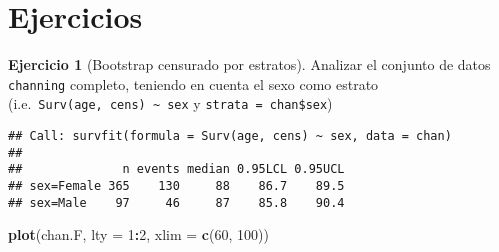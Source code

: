 \documentclass[
]{book}
\newenvironment{Shaded}{\begin{snugshade}}{\end{snugshade}}
\newcommand{\CommentTok}[1]{\textcolor[rgb]{0.56,0.35,0.01}{\textit{#1}}}
\newcommand{\DataTypeTok}[1]{\textcolor[rgb]{0.13,0.29,0.53}{#1}}
\newcommand{\DecValTok}[1]{\textcolor[rgb]{0.00,0.00,0.81}{#1}}
\newcommand{\KeywordTok}[1]{\textcolor[rgb]{0.13,0.29,0.53}{\textbf{#1}}}
\newcommand{\NormalTok}[1]{#1}
\newcommand{\OperatorTok}[1]{\textcolor[rgb]{0.81,0.36,0.00}{\textbf{#1}}}
\newcommand{\StringTok}[1]{\textcolor[rgb]{0.31,0.60,0.02}{#1}}
\theoremstyle{break}
\theoremstyle{definition}
\theoremstyle{definition}
\theoremstyle{definition}
\newtheorem{exercise}{Ejercicio}[chapter]
\theoremstyle{remark}
\begin{document}
\hypertarget{ejercicios}{%
\section{Ejercicios}\label{ejercicios}}

\begin{exercise}[Bootstrap censurado por estratos]
\protect\hypertarget{exr:censboot-strata-ej}{}{\label{exr:censboot-strata-ej} \iffalse (Bootstrap censurado por estratos) \fi{} }
Analizar el conjunto de datos \texttt{channing} completo, teniendo en cuenta el sexo como estrato
(i.e.~\texttt{Surv(age,\ cens)\ \textasciitilde{}\ sex} y \texttt{strata\ =\ chan\$sex})
\end{exercise}

\begin{Shaded}
\end{Shaded}

\begin{verbatim}
## Call: survfit(formula = Surv(age, cens) ~ sex, data = chan)
## 
##              n events median 0.95LCL 0.95UCL
## sex=Female 365    130     88    86.7    89.5
## sex=Male    97     46     87    85.8    90.4
\end{verbatim}

\begin{Shaded}
\begin{Highlighting}[]
\KeywordTok{plot}\NormalTok{(chan.F, }\DataTypeTok{lty =} \DecValTok{1}\OperatorTok{:}\DecValTok{2}\NormalTok{, }\DataTypeTok{xlim =} \KeywordTok{c}\NormalTok{(}\DecValTok{60}\NormalTok{, }\DecValTok{100}\NormalTok{))}
\end{Highlighting}
\end{Shaded}
\end{document}
